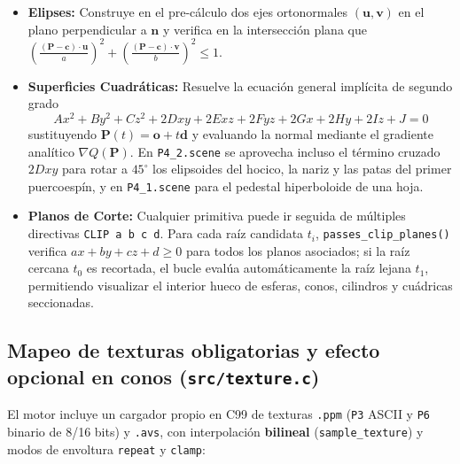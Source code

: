 \documentclass[11pt,letterpaper]{article}
\begin{document}
\begin{itemize}[leftmargin=1.5em]
    \item \textbf{Elipses:} Construye en el pre-cálculo dos ejes ortonormales $(\mathbf{u}, \mathbf{v})$ en el plano perpendicular a $\mathbf{n}$ y verifica en la intersección plana que $\left(\frac{(\mathbf{P}-\mathbf{c})\cdot\mathbf{u}}{a}\right)^2 + \left(\frac{(\mathbf{P}-\mathbf{c})\cdot\mathbf{v}}{b}\right)^2 \le 1$.
    \item \textbf{Superficies Cuadráticas:} Resuelve la ecuación general implícita de segundo grado
    \[
        Ax^2 + By^2 + Cz^2 + 2Dxy + 2Exz + 2Fyz + 2Gx + 2Hy + 2Iz + J = 0
    \]
    sustituyendo $\mathbf{P}(t) = \mathbf{o} + t\mathbf{d}$ y evaluando la normal mediante el gradiente analítico $\nabla Q(\mathbf{P})$. En \texttt{P4\_2.scene} se aprovecha incluso el término cruzado $2Dxy$ para rotar a $45^\circ$ los elipsoides del hocico, la nariz y las patas del primer puercoespín, y en \texttt{P4\_1.scene} para el pedestal hiperboloide de una hoja.
    \item \textbf{Planos de Corte:} Cualquier primitiva puede ir seguida de múltiples directivas \texttt{CLIP a b c d}. Para cada raíz candidata $t_i$, \texttt{passes\_clip\_planes()} verifica $a x + b y + c z + d \ge 0$ para todos los planos asociados; si la raíz cercana $t_0$ es recortada, el bucle evalúa automáticamente la raíz lejana $t_1$, permitiendo visualizar el interior hueco de esferas, conos, cilindros y cuádricas seccionadas.
\end{itemize}

\subsection{Mapeo de texturas obligatorias y efecto opcional en conos (\texttt{src/texture.c})}

El motor incluye un cargador propio en C99 de texturas \texttt{.ppm} (\texttt{P3} ASCII y \texttt{P6} binario de 8/16 bits) y \texttt{.avs}, con interpolación \textbf{bilineal} (\texttt{sample\_texture}) y modos de envoltura \texttt{repeat} y \texttt{clamp}:
\end{document}
